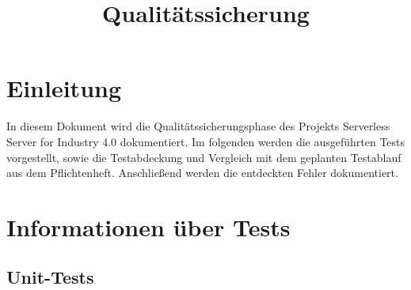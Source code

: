 \documentclass[a4paper,20pt,oneside]{book}
\begin{document}
	\title{\Huge{\bfseries{Qualitätssicherung}}}
	\author{}
	\maketitle
	\clearpage
	
	\tableofcontents
	
	\chapter{Einleitung}
	In diesem Dokument wird die Qualitätssicherungsphase des Projekts Serverless Server for Industry 4.0 dokumentiert. Im folgenden werden die ausgeführten Tests vorgestellt, sowie die Testabdeckung und Vergleich mit dem geplanten Testablauf aus dem Pflichtenheft. Anschließend werden die entdeckten Fehler dokumentiert.

	
	
	\chapter{Informationen über Tests}
	\section{Unit-Tests}
		
	\begin{table}[h!]
	\end{table}
\end{document}
